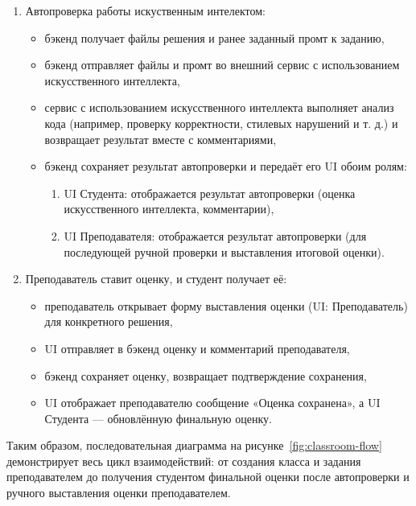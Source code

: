 \begin{enumerate}
    \item Автопроверка работы искуственным интелектом:
    \begin{itemize}
        \item бэкенд получает файлы решения и ранее заданный промт к заданию,
        \item бэкенд отправляет файлы и промт во внешний сервис с использованием искусственного интеллекта,
        \item сервис с использованием искусственного интеллекта выполняет анализ кода (например, проверку корректности, стилевых нарушений и т. д.) и возвращает результат вместе с комментариями,
        \item бэкенд сохраняет результат автопроверки и передаёт его UI обоим ролям:
        \begin{enumerate}
            \item UI Студента: отображается результат автопроверки (оценка искусственного интеллекта, комментарии),
            \item UI Преподавателя: отображается результат автопроверки (для последующей ручной проверки и выставления итоговой оценки).
        \end{enumerate}
    \end{itemize}

    \item Преподаватель ставит оценку, и студент получает её:
    \begin{itemize}
        \item преподаватель открывает форму выставления оценки (UI: Преподаватель) для конкретного решения,
        \item UI отправляет в бэкенд оценку и комментарий преподавателя,
        \item бэкенд сохраняет оценку, возвращает подтверждение сохранения,
        \item UI отображает преподавателю сообщение «Оценка сохранена», а UI Студента — обновлённую финальную оценку.
    \end{itemize}
\end{enumerate}

Таким образом, последовательная диаграмма на рисунке~\ref{fig:classroom-flow} демонстрирует весь цикл взаимодействий: от создания класса и задания преподавателем до получения студентом финальной оценки после автопроверки и ручного выставления оценки преподавателем.
